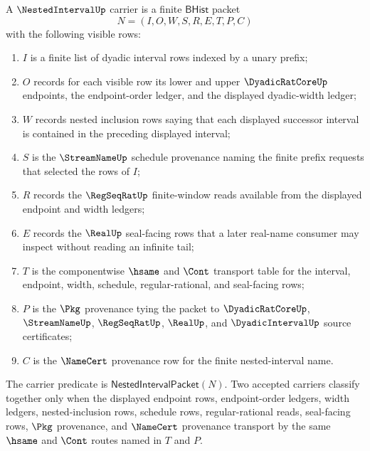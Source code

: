 \begin{definition}
\label{def:nestedinterval-finite-carrier}
A $\NestedIntervalUp$ carrier is a finite $\mathsf{BHist}$ packet
$$
N=(I,O,W,S,R,E,T,P,C)
$$
with the following visible rows:
\begin{enumerate}
\item $I$ is a finite list of dyadic interval rows indexed by a unary prefix;
\item $O$ records for each visible row its lower and upper $\DyadicRatCoreUp$ endpoints, the endpoint-order ledger, and the displayed dyadic-width ledger;
\item $W$ records nested inclusion rows saying that each displayed successor interval is contained in the preceding displayed interval;
\item $S$ is the $\StreamNameUp$ schedule provenance naming the finite prefix requests that selected the rows of $I$;
\item $R$ records the $\RegSeqRatUp$ finite-window reads available from the displayed endpoint and width ledgers;
\item $E$ records the $\RealUp$ seal-facing rows that a later real-name consumer may inspect without reading an infinite tail;
\item $T$ is the componentwise $\hsame$ and $\Cont$ transport table for the interval, endpoint, width, schedule, regular-rational, and seal-facing rows;
\item $P$ is the $\Pkg$ provenance tying the packet to $\DyadicRatCoreUp$, $\StreamNameUp$, $\RegSeqRatUp$, $\RealUp$, and $\DyadicIntervalUp$ source certificates;
\item $C$ is the $\NameCert$ provenance row for the finite nested-interval name.
\end{enumerate}
The carrier predicate is $\mathsf{NestedIntervalPacket}(N)$. Two accepted carriers classify together only when the displayed endpoint rows, endpoint-order ledgers, width ledgers, nested-inclusion rows, schedule rows, regular-rational reads, seal-facing rows, $\Pkg$ provenance, and $\NameCert$ provenance transport by the same $\hsame$ and $\Cont$ routes named in $T$ and $P$.
\end{definition}

